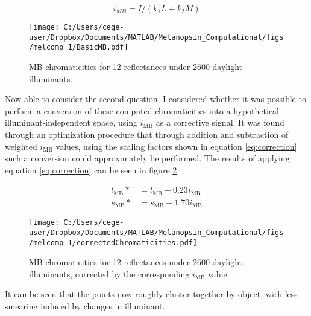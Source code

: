 \begin{equation} \label{eq:i}
i_{MB} = I/(k_1L + k_2M) 
\end{equation}

\begin{figure}[h]
    \centering
    \texttt{[image: C:/Users/cege-user/Dropbox/Documents/MATLAB/Melanopsin\_Computational/figs/melcomp\_1/BasicMB.pdf]}
    \caption[MB chromaticities for 12 reflectances under 2600 daylight illuminants.]{\gls{MB} chromaticities for 12 reflectances under 2600 daylight illuminants.}
    \label{fig:mb}
\end{figure} 

Now able to consider the second question, I considered whether it was possible to perform a conversion of these computed chromaticities into a hypothetical illuminant-independent space, using $i_{\text{MB}}$ as a corrective signal. It was found through an optimization procedure that through addition and subtraction of weighted $i_{\text{MB}}$ values, using the scaling factors shown in equation \ref{eq:correction} such a conversion could approximately be performed. The results of applying equation \ref{eq:correction} can be seen in figure \ref{fig:corrected}.

\begin{subequations} \label{eq:correction}
\begin{align}
l_{\text{MB}}* &= l_{\text{MB}} + 0.23i_{\text{MB}}\\ %
s_{\text{MB}}* &= s_{\text{MB}} - 1.70i_{\text{MB}}
\end{align}
\end{subequations}

\begin{figure}[h]
    \centering
    \texttt{[image: C:/Users/cege-user/Dropbox/Documents/MATLAB/Melanopsin\_Computational/figs/melcomp\_1/correctedChromaticities.pdf]}
    \caption[MB chromaticities for 12 reflectances under 2600 daylight illuminants, corrected by the corresponding $i_{\text{MB}}$ value.]{\gls{MB} chromaticities for 12 reflectances under 2600 daylight illuminants, corrected by the corresponding $i_{\text{MB}}$ value.}
    \label{fig:corrected}
\end{figure} 

It can be seen that the points now roughly cluster together by object, with less smearing induced by changes in illuminant.

